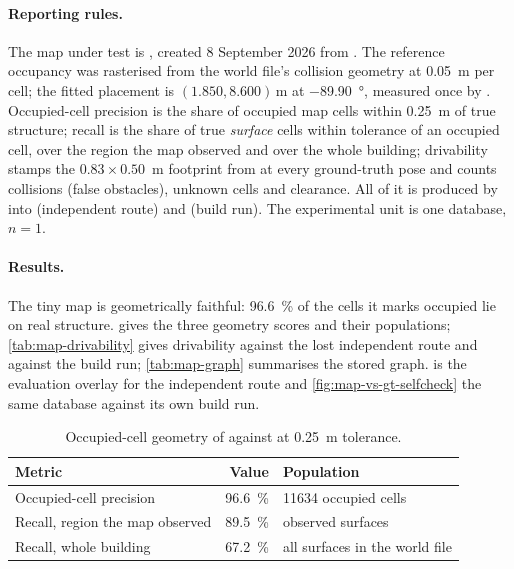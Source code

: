 \documentclass[11pt,a4paper,notitlepage]{report}
\begin{document}
\paragraph{Reporting rules.} The map under test is ,
created 8 September 2026 from
. The
reference occupancy was rasterised from the world file's collision geometry at
\SI{0.05}{\metre} per cell; the fitted placement is
$(1.850, 8.600)\,\si{\metre}$ at \SI{-89.90}{\degree}, measured once by
. Occupied-cell precision is the share of
occupied map cells within \SI{0.25}{\metre} of true structure; recall is the
share of true \emph{surface} cells within tolerance of an occupied cell, over
the region the map observed and over the whole building; drivability stamps the
$0.83\times0.50$~m footprint from  at every
ground-truth pose and counts collisions (false obstacles), unknown cells and
clearance. All of it is produced by  into
 (independent route) and
 (build run). The experimental
unit is one database, $n=1$.

\paragraph{Results.} The tiny map is geometrically faithful: \SI{96.6}{\percent}
of the cells it marks occupied lie on real structure.
 gives the three geometry scores and their populations;
\cref{tab:map-drivability} gives drivability against the lost independent
route and against the build run; \cref{tab:map-graph} summarises the stored
graph.  is the evaluation overlay for the independent
route and \cref{fig:map-vs-gt-selfcheck} the same database against its own
build run.

\begin{table}[htbp]
\centering
\caption{Occupied-cell geometry of  against
 at \SI{0.25}{\metre} tolerance.}
\label{tab:map-geometry}
\small
\begin{tabularx}{\textwidth}{>{\raggedright\arraybackslash}p{}r>{\raggedright\arraybackslash}X}
\toprule
Metric & Value & Population \\
\midrule
Occupied-cell precision & \SI{96.6}{\percent} & \num{11634} occupied cells \\
Recall, region the map observed & \SI{89.5}{\percent} & observed surfaces \\
Recall, whole building & \SI{67.2}{\percent} & all surfaces in the world file \\
\bottomrule
\end{tabularx}
\end{table}
\end{document}
